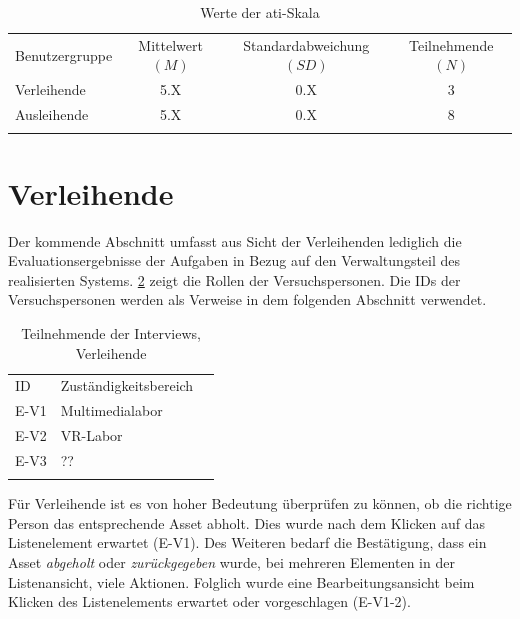 \begin{table}[h]
  \centering
  \caption{Werte der \ac{ati}-Skala}
  \begin{tabular}{lccc}
    \arrayrulecolor{maincolor}\hline
    \sffamily\color{maincolor}Benutzergruppe            &
    \sffamily\color{maincolor}Mittelwert $(M)$          &
    \sffamily\color{maincolor}Standardabweichung $(SD)$ &
    \sffamily\color{maincolor}Teilnehmende $(N)$                        \\
    \arrayrulecolor{maincolor}\hline
    Verleihende                                         & 5.X & 0.X & 3 \\
    Ausleihende                                         & 5.X & 0.X & 8 \\
    \arrayrulecolor{maincolor}\hline
  \end{tabular}
  \label{table:atipartzwei}
\end{table}


\section{Verleihende}
Der kommende Abschnitt umfasst aus Sicht der Verleihenden lediglich die Evaluationsergebnisse der
Aufgaben in Bezug auf den Verwaltungsteil des realisierten Systems.
\ref{table:vzwei} zeigt die Rollen der Versuchspersonen. Die IDs der Versuchspersonen werden als
Verweise in dem folgenden Abschnitt verwendet.

\begin{table}[h]
  \centering
  \caption{Teilnehmende der Interviews, Verleihende}
  \begin{tabular}{lll}
    \arrayrulecolor{maincolor}\hline
    \sffamily\color{maincolor}ID &
    \sffamily\color{maincolor}Zuständigkeitsbereich \\
    \arrayrulecolor{maincolor}\hline
    E-V1                         & Multimedialabor  \\
    E-V2                         & VR-Labor         \\
    E-V3                         & ??               \\
    \arrayrulecolor{maincolor}\hline
  \end{tabular}
  \label{table:vzwei}
\end{table}

Für Verleihende ist es von hoher Bedeutung überprüfen zu können, ob die richtige
Person das entsprechende Asset abholt. Dies wurde nach dem Klicken auf das
Listenelement erwartet (E-V1). Des Weiteren bedarf die Bestätigung, dass ein
Asset \textit{abgeholt} oder \textit{zurückgegeben} wurde, bei mehreren
Elementen in der Listenansicht, viele Aktionen. Folglich wurde eine
Bearbeitungsansicht beim Klicken des Listenelements erwartet oder vorgeschlagen
(E-V1-2).

